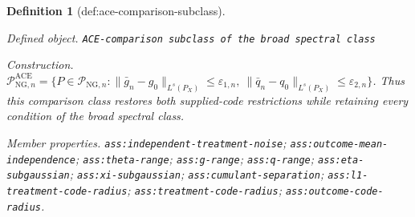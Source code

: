 \documentclass{article}
\newtheorem{definition}{Definition}
\begin{document}
\begin{definition}[def:ace-comparison-subclass]\label{def:ace-comparison-subclass}
\par\smallskip\noindent\emph{Defined object.} \texttt{ACE-\allowbreak{}comparison subclass of the broad spectral class}
\par\smallskip\noindent\emph{Construction.} \(\mathcal P_{\mathrm{NG},n}^{\mathrm{ACE}}=\{P\in\mathcal P_{\mathrm{NG},n}:\|\bar g_n-g_0\|_{L^s(P_X)}\le\varepsilon_{1,n},\ \|\bar q_n-q_0\|_{L^s(P_X)}\le\varepsilon_{2,n}\}\). Thus this comparison class restores both supplied-code restrictions while retaining every condition of the broad spectral class.
\par\smallskip\noindent\emph{Member properties.} \texttt{ass:\allowbreak{}independent-\allowbreak{}treatment-\allowbreak{}noise}; \texttt{ass:\allowbreak{}outcome-\allowbreak{}mean-\allowbreak{}independence}; \texttt{ass:\allowbreak{}theta-\allowbreak{}range}; \texttt{ass:\allowbreak{}g-\allowbreak{}range}; \texttt{ass:\allowbreak{}q-\allowbreak{}range}; \texttt{ass:\allowbreak{}eta-\allowbreak{}subgaussian}; \texttt{ass:\allowbreak{}xi-\allowbreak{}subgaussian}; \texttt{ass:\allowbreak{}cumulant-\allowbreak{}separation}; \texttt{ass:\allowbreak{}l1-\allowbreak{}treatment-\allowbreak{}code-\allowbreak{}radius}; \texttt{ass:\allowbreak{}treatment-\allowbreak{}code-\allowbreak{}radius}; \texttt{ass:\allowbreak{}outcome-\allowbreak{}code-\allowbreak{}radius}.
\end{definition}
\end{document}
